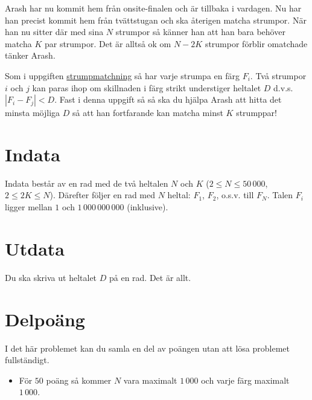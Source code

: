 
Arash har nu kommit hem från onsite-finalen och är tillbaka i
vardagen. Nu har han precist kommit hem från tvättstugan och ska
återigen matcha strumpor. När han nu sitter där med sina $N$ strumpor
så känner han att han bara behöver matcha $K$ par strumpor. Det
är alltså ok om $N-2K$ strumpor förblir omatchade tänker Arash. 

Som i uppgiften
\href{https://po.scrool.se/problems/strumpor}{strumpmatchning} så har
varje strumpa en färg $F_i$. Två strumpor $i$ och $j$ kan paras ihop
om skillnaden i färg strikt understiger heltalet $D$ d.v.s. $|F_{i} - F_{j}|<D$.
Fast i denna uppgift så så ska du hjälpa Arash att hitta det minsta
möjliga $D$ så att han fortfarande kan matcha minst $K$ strumppar!

\section*{Indata}

Indata består av en rad med de två heltalen $N$ och $K$ ($2 \le N \le 50\,000$, $2 \le 2K \le N$). Därefter följer en rad med $N$ heltal: $F_1$, $F_2$, o.s.v. till $F_N$. Talen $F_i$ ligger mellan $1$ och $1\,000\,000\,000$ (inklusive).

\section*{Utdata}

Du ska skriva ut heltalet $D$ på en rad. Det är allt.

\section*{Delpoäng}

I det här problemet kan du samla en del av poängen utan att lösa
problemet fullständigt.

\begin{itemize}
    \item För $50$ poäng så kommer $N$ vara maximalt $1\,000$ och varje färg maximalt $1\,000$.
\end{itemize}
